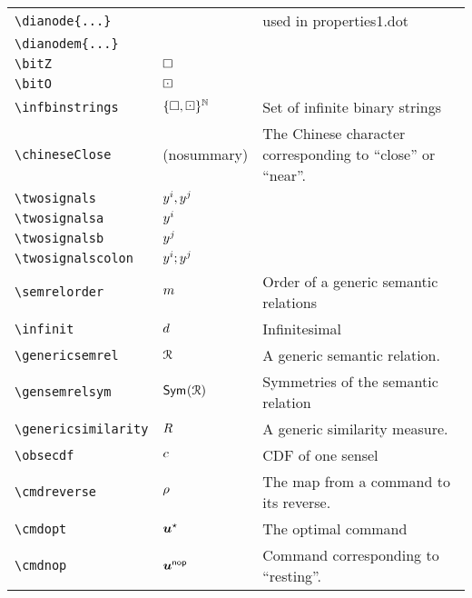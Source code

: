 \begin{longtable}{lll}
 {\color[rgb]{0.5,0.5,0.5}\texttt{\textbackslash dianode\{...\}}} &  &  used in properties1.dot\\ 
 {\color[rgb]{0.5,0.5,0.5}\texttt{\textbackslash dianodem\{...\}}} &  & \\ 
 {\color[rgb]{0.5,0.5,0.5}\texttt{\textbackslash bitZ}} & $\square$ & \\ 
 {\color[rgb]{0.5,0.5,0.5}\texttt{\textbackslash bitO}} & $\boxdot$ & \\ 
 {\color[rgb]{0.5,0.5,0.5}\texttt{\textbackslash infbinstrings}} & ${\{\square,\boxdot\}^\mathbb{N}}$ &  Set of infinite binary strings\\ 
 {\color[rgb]{0.5,0.5,0.5}\texttt{\textbackslash chineseClose}} & (nosummary) &  The Chinese character corresponding to ``close'' or ``near''. \\ 
 {\color[rgb]{0.5,0.5,0.5}\texttt{\textbackslash twosignals}} & $y^i,y^j$ & \\ 
 {\color[rgb]{0.5,0.5,0.5}\texttt{\textbackslash twosignalsa}} & $y^i$ & \\ 
 {\color[rgb]{0.5,0.5,0.5}\texttt{\textbackslash twosignalsb}} & $y^j$ & \\ 
 {\color[rgb]{0.5,0.5,0.5}\texttt{\textbackslash twosignalscolon}} & $y^i;y^j$ & \\ 
 {\color[rgb]{0.5,0.5,0.5}\texttt{\textbackslash semrelorder}} & $m$ &  Order of a generic semantic relations\\ 
 {\color[rgb]{0.5,0.5,0.5}\texttt{\textbackslash infinit}} & $d$ &  Infinitesimal\\ 
 {\color[rgb]{0.5,0.5,0.5}\texttt{\textbackslash genericsemrel}} & $\mathcal{R}$ &  A generic semantic relation.\\ 
 {\color[rgb]{0.5,0.5,0.5}\texttt{\textbackslash gensemrelsym}} & $\mathsf{Sym}^{}(\mathcal{R})$ &  Symmetries of the semantic relation\\ 
 {\color[rgb]{0.5,0.5,0.5}\texttt{\textbackslash genericsimilarity}} & $R$ &  A generic similarity measure.\\ 
 {\color[rgb]{0.5,0.5,0.5}\texttt{\textbackslash obsecdf}} & ${c}$ &  CDF of one sensel\\ 
 {\color[rgb]{0.5,0.5,0.5}\texttt{\textbackslash cmdreverse}} & $\rho$ &  The map from a command to its reverse.\\ 
 {\color[rgb]{0.5,0.5,0.5}\texttt{\textbackslash cmdopt}} & $\boldsymbol{u}^\star$ &  The optimal command\\ 
 {\color[rgb]{0.5,0.5,0.5}\texttt{\textbackslash cmdnop}} & $\boldsymbol{u}^{\mathsf{nop}}$ &  Command corresponding to ``resting''.\\ 

\end{longtable}
